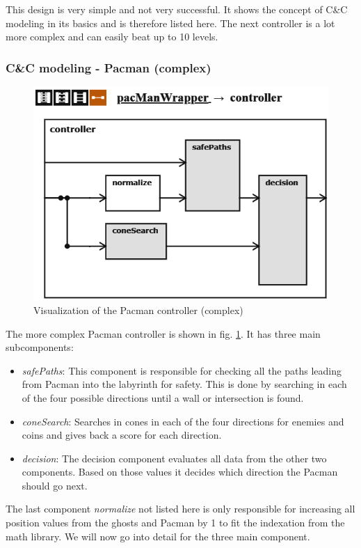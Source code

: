This design is very simple and not very successful. It shows the concept of C\&C modeling in its basics and is therefore listed here. The next controller is a lot more complex and can easily beat up to 10 levels.

\subsubsection{C\&C modeling - Pacman (complex)}
\begin{figure}
	\caption{Visualization of the Pacman controller (complex)}
	\label{fig:visPacman20}
	\centering
	\includegraphics[scale=0.85]{pictures/Pacman/Controller20.png}
\end{figure}

The more complex Pacman controller is shown in fig. \ref{fig:visPacman20}.
It has three main subcomponents:
\begin{itemize}
	\item \textit{safePaths}: This component is responsible for checking all the paths leading from Pacman into the labyrinth for safety. This is done by searching in each of the four possible directions until a wall or intersection is found.	
	\item \textit{coneSearch}: Searches in cones in each of the four directions for enemies and coins and gives back a score for each direction.	
	\item \textit{decision}: The decision component evaluates all data from the other two components. Based on those values it decides which direction the Pacman should go next.	
\end{itemize}
The last component \textit{normalize} not listed here is only responsible for increasing all position values from the ghosts and Pacman by 1 to fit the indexation from the math library.
We will now go into detail for the three main component.
\newline

